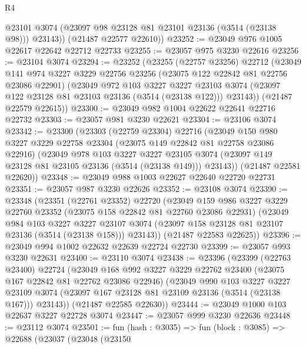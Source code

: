 \begin{lexlean}{R4}
\begin{coremodule}
          @23101
          @3074
          (@23097 @98 @23128 @81 @23101 @23136 (@3514 (@23138 @98)))
          @23143))
      (@21487 @22577 @22610))
@23252 := @23049 @976 @1005 @22617 @22642 @22712 @22733
@23255 := @23057 @975 @3230 @22616
@23256 := @23104 @3074
@23294 := @23252
    (@23255
      (@22757 @23256)
      @22712
      (@23049
        @141
        @974
        @3227
        @3229
        @22756
        @23256
        (@23075 @122 @22842 @81 @22756 @23086 @22901)
        (@23049
          @972
          @103
          @3227
          @3227
          @23103
          @3074
          (@23097 @122 @23128 @81 @23103 @23136 (@3514 (@23138 @122)))
          @23143))
      (@21487 @22579 @22615))
@23300 := @23049 @982 @1004 @22622 @22641 @22716 @22732
@23303 := @23057 @981 @3230 @22621
@23304 := @23106 @3074
@23342 := @23300
    (@23303
      (@22759 @23304)
      @22716
      (@23049
        @150
        @980
        @3227
        @3229
        @22758
        @23304
        (@23075 @149 @22842 @81 @22758 @23086 @22916)
        (@23049
          @978
          @103
          @3227
          @3227
          @23105
          @3074
          (@23097 @149 @23128 @81 @23105 @23136 (@3514 (@23138 @149)))
          @23143))
      (@21487 @22581 @22620))
@23348 := @23049 @988 @1003 @22627 @22640 @22720 @22731
@23351 := @23057 @987 @3230 @22626
@23352 := @23108 @3074
@23390 := @23348
    (@23351
      (@22761 @23352)
      @22720
      (@23049
        @159
        @986
        @3227
        @3229
        @22760
        @23352
        (@23075 @158 @22842 @81 @22760 @23086 @22931)
        (@23049
          @984
          @103
          @3227
          @3227
          @23107
          @3074
          (@23097 @158 @23128 @81 @23107 @23136 (@3514 (@23138 @158)))
          @23143))
      (@21487 @22583 @22625))
@23396 := @23049 @994 @1002 @22632 @22639 @22724 @22730
@23399 := @23057 @993 @3230 @22631
@23400 := @23110 @3074
@23438 := @23396
    (@23399
      (@22763 @23400)
      @22724
      (@23049
        @168
        @992
        @3227
        @3229
        @22762
        @23400
        (@23075 @167 @22842 @81 @22762 @23086 @22946)
        (@23049
          @990
          @103
          @3227
          @3227
          @23109
          @3074
          (@23097 @167 @23128 @81 @23109 @23136 (@3514 (@23138 @167)))
          @23143))
      (@21487 @22585 @22630))
@23444 := @23049 @1000 @103 @22637 @3227 @22728 @3074
@23447 := @23057 @999 @3230 @22636
@23448 := @23112 @3074
@23501 := fun (hash : @3035) =>
  fun (block : @3085) =>
  @22688
    (@23037
      (@23048
        (@23150

\end{coremodule}
\end{lexlean}
